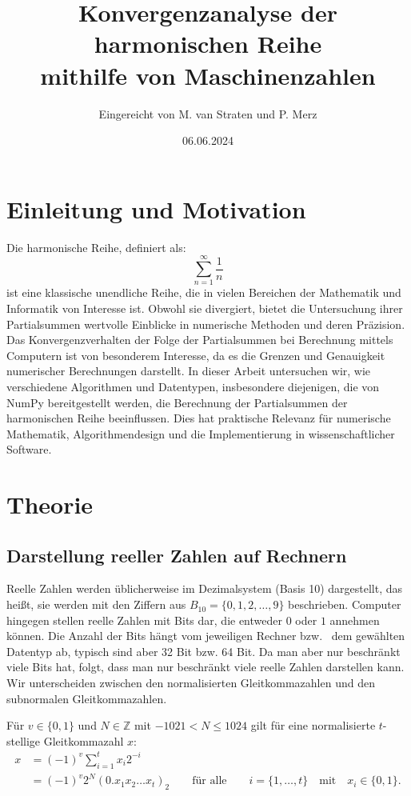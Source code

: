 \documentclass{scrartcl}
\title{Konvergenzanalyse der harmonischen Reihe\\
mithilfe von Maschinenzahlen}
\author{
  Eingereicht von M. van Straten und P. Merz
}
\date{06.06.2024}
\begin{document}
\maketitle
\cleardoublepage{}
\tableofcontents
\cleardoublepage{}

\section{Einleitung und Motivation}
Die harmonische Reihe, definiert als: \[ \sum_{n=1}^{\infty} \frac{1}{n} \] ist eine klassische unendliche Reihe, die in vielen Bereichen der
    Mathematik und Informatik von Interesse ist. Obwohl sie divergiert, bietet
    die Untersuchung ihrer Partialsummen wertvolle Einblicke in numerische
    Methoden und deren Präzision. Das Konvergenzverhalten der Folge der
    Partialsummen bei Berechnung mittels Computern ist von besonderem
    Interesse, da es die Grenzen und Genauigkeit numerischer Berechnungen
    darstellt. In dieser Arbeit untersuchen wir, wie verschiedene Algorithmen
    und Datentypen, insbesondere diejenigen, die von NumPy bereitgestellt
    werden, die Berechnung der Partialsummen der harmonischen Reihe
    beeinflussen. Dies hat praktische Relevanz für numerische Mathematik,
    Algorithmendesign und die Implementierung in wissenschaftlicher Software.

\section{Theorie}
\subsection{Darstellung reeller Zahlen auf Rechnern}
Reelle Zahlen werden üblicherweise im Dezimalsystem (Basis 10) dargestellt, das
heißt, sie werden mit den Ziffern aus \( B_{10} = \{0, 1, 2, \dots, 9\} \)
beschrieben. Computer hingegen stellen reelle Zahlen mit Bits dar, die entweder
\(0\) oder \(1\) annehmen können. Die Anzahl der Bits hängt vom jeweiligen
Rechner bzw. \ dem gewählten Datentyp ab, typisch sind aber 32 Bit bzw. 64 Bit.
Da man aber nur beschränkt viele Bits hat, folgt, dass man nur beschränkt viele
reelle Zahlen darstellen kann. Wir unterscheiden zwischen den normalisierten
Gleitkommazahlen und den subnormalen Gleitkommazahlen.

Für \( v \in \{0, 1\} \) und \( N \in \mathbb{Z} \) mit \( -1021 < N \leq 1024
\) gilt für eine normalisierte \( t \)-stellige Gleitkommazahl \( x \):
\begin{align*}
    x & = {(-1)}^v \sum_{i=1}^t x_i 2^{-i}                                                                                                \\
      & = (-1)^v 2^N (0.x_1 x_2 \ldots x_t)_2 \qquad \text{für alle} \qquad i = \{1, \ldots, t\} \quad \text{mit} \quad x_i \in \{0, 1\}.
\end{align*}
\end{document}
